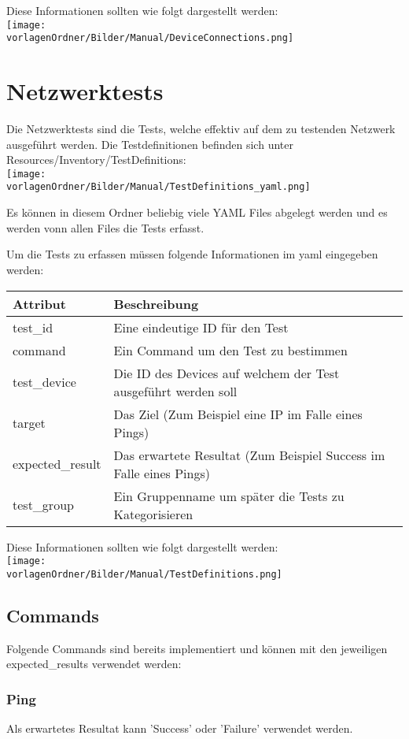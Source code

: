 \documentclass[
	ngerman,
	toc=listof, %
	toc=bibliography, %
	footnotes=multiple, %
	parskip=half, %
	numbers=noendperiod %
]{scrartcl}
\newcommand{\vorlagenOrdner}{../99_Vorlagen} %
\begin{document}
		Diese Informationen sollten wie folgt dargestellt werden: \\
		\texttt{[image: \\vorlagenOrdner/Bilder/Manual/DeviceConnections.png]}

\section{Netzwerktests}
	Die Netzwerktests sind die Tests, welche effektiv auf dem zu testenden Netzwerk ausgeführt werden.
	Die Testdefinitionen befinden sich unter Resources/Inventory/TestDefinitions:\\
	\texttt{[image: \\vorlagenOrdner/Bilder/Manual/TestDefinitions\_yaml.png]}

	Es können in diesem Ordner beliebig viele YAML Files abgelegt werden und es werden vonn allen Files die Tests erfasst.

	Um die Tests zu erfassen müssen folgende Informationen im yaml eingegeben werden:\\
	\begin{tabularx}{\textwidth}{ll}
		\toprule
		Attribut & Beschreibung \\
		\midrule
		test\_id & Eine eindeutige ID für den Test \\
		command & Ein Command um den Test zu bestimmen \\
		test\_device & Die ID des Devices auf welchem der Test ausgeführt werden soll\\
		target & Das Ziel (Zum Beispiel eine IP im Falle eines Pings)\\
		expected\_result & Das erwartete Resultat (Zum Beispiel Success im Falle eines Pings)\\
		test\_group & Ein Gruppenname um später die Tests zu Kategorisieren\\
		\midrule
	\end{tabularx}

	Diese Informationen sollten wie folgt dargestellt werden: \\
	\texttt{[image: \\vorlagenOrdner/Bilder/Manual/TestDefinitions.png]}
	\newpage

	\subsection{Commands}
		Folgende Commands sind bereits implementiert und können mit den jeweiligen expected\_results verwendet werden:
		\subsubsection{Ping}
			Als erwartetes Resultat kann 'Success' oder 'Failure' verwendet werden.
\end{document}
